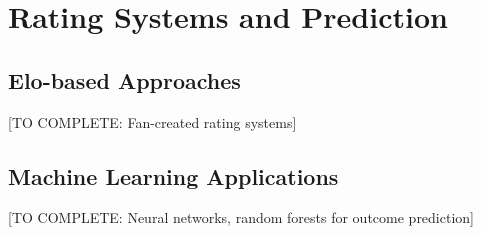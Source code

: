 \section{Rating Systems and Prediction}

\subsection{Elo-based Approaches}

[TO COMPLETE: Fan-created rating systems]

\subsection{Machine Learning Applications}

[TO COMPLETE: Neural networks, random forests for outcome prediction]